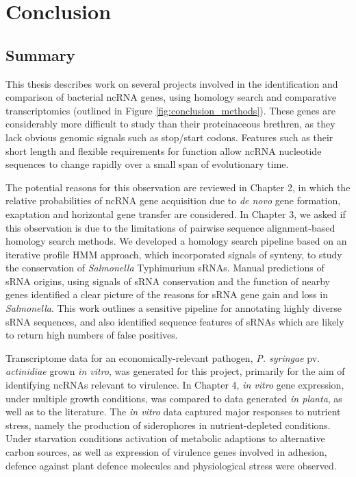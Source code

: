 \chapter{Conclusion}
\label{chap:conclusion}

\section{Summary}

This thesis describes work on several projects involved in the identification and comparison of bacterial ncRNA genes, using homology search and comparative transcriptomics (outlined in Figure \ref{fig:conclusion_methods}). These genes are considerably more difficult to study than their proteinaceous brethren, as they lack obvious genomic signals such as stop/start codons. Features such as their short length and flexible requirements for function allow ncRNA nucleotide sequences to change rapidly over a small span of evolutionary time.

The potential reasons for this observation are reviewed in Chapter 2, in which the relative probabilities of ncRNA gene acquisition due to \textit{de novo} gene formation, exaptation and horizontal gene transfer are considered. In Chapter 3, we asked if this observation is due to the limitations of pairwise sequence alignment-based homology search methods. We developed a homology search pipeline based on an iterative profile HMM approach, which incorporated signals of synteny, to study the conservation of \textit{Salmonella} Typhimurium sRNAs. Manual predictions of sRNA origins, using signals of sRNA conservation and the function of nearby genes identified a clear picture of the reasons for sRNA gene gain and loss in \textit{Salmonella}. This work outlines a sensitive pipeline for annotating highly diverse sRNA sequences, and also identified sequence features of sRNAs which are likely to return high numbers of false positives.

Transcriptome data for an economically-relevant pathogen, \textit{P. syringae} pv. \textit{actinidiae} grown \textit{in vitro}, was generated for this project, primarily for the aim of identifying ncRNAs relevant to virulence. In Chapter 4, \textit{in vitro} gene expression, under multiple growth conditions, was compared to data generated \textit{in planta}, as well as to the literature. The \textit{in vitro} data captured major responses to nutrient stress, namely the production of siderophores in nutrient-depleted conditions. Under starvation conditions activation of metabolic adaptions to alternative carbon sources, as well as expression of virulence genes involved in adhesion, defence against plant defence molecules and physiological stress were observed.

